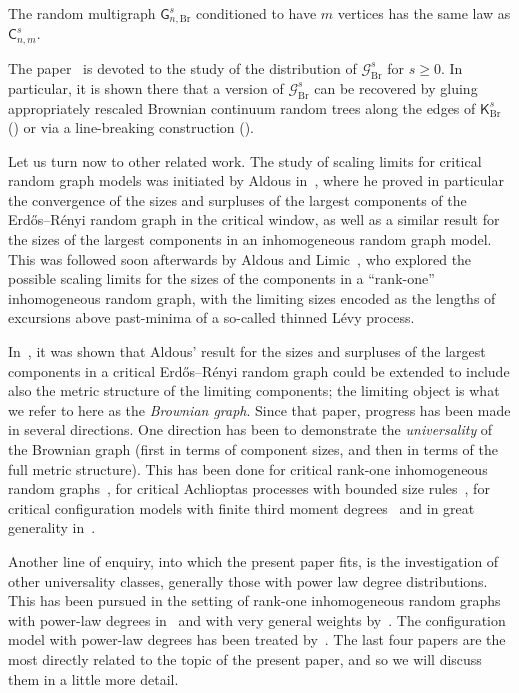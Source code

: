 \documentclass[AHL,Unicode,longabstracts,published]{cedram}
\newcommand{\Br}{\mathrm{Br}}
\newcommand{\cG}{\mathcal{G}}
\newcommand{\sG}{\mathsf{G}}
\newcommand{\sK}{\mathsf{K}}
\newcommand{\sC}{\mathsf{C}}
\begin{document}

\begin{coro}
The random multigraph $\sG_{n,\Br}^s$ conditioned to have $m$ vertices has the same law as $\sC_{n,m}^s$.
\end{coro}

The paper~\cite{ABBrGo} is devoted to the study of the distribution of $\cG_{\Br}^s$ for $s \ge 0$. In particular, it is shown there that a version of $\cG_{\Br}^s$ can be recovered by gluing appropriately rescaled Brownian continuum random trees along the edges of $\sK_{\Br}^s$ (\cite[Procedure~1]{ABBrGo}) or via a line-breaking construction (\cite[Procedure~2 $\&$ Theorem~4]{ABBrGo}).

Let us turn now to other related work. The study of scaling limits for critical random graph models was initiated by Aldous in~\cite{AldousCritRG}, where he proved in particular the convergence of the sizes and surpluses of the largest components of the Erd\H{o}s--Rényi random graph in the critical window, as well as a similar result for the sizes of the largest components in an inhomogeneous random graph model. This was followed soon afterwards by Aldous and Limic~\cite{AldousLimic}, who explored the possible scaling limits for the sizes of the components in a ``rank-one'' inhomogeneous random graph, with the limiting sizes encoded as the lengths of excursions above past-minima of a so-called thinned Lévy process.

In~\cite{ABBrGo12}, it was shown that Aldous' result for the sizes and surpluses of the largest components in a critical Erd\H{o}s--Rényi random graph could be extended to include also the metric structure of the limiting components; the limiting object is what we refer to here as the \emph{Brownian graph}. Since that paper, progress has been made in several directions. One direction has been to demonstrate the \emph{universality} of the Brownian graph (first in terms of component sizes, and then in terms of the full metric structure). This has been done for critical rank-one inhomogeneous random graphs~\cite{BhamidiSenWang17,BhvdHvL3rdMo,Turova}, for critical Achlioptas processes with bounded size rules~\cite{AugMultCoal}, for critical configuration models with finite third moment degrees~\cite{BS16+,DhvdHvLS17,Joseph14, NachmiasPeres,Riordan12} and in great generality in~\cite{BBSW14+}.

Another line of enquiry, into which the present paper fits, is the investigation of other universality classes, generally those with power law degree distributions. This has been pursued in the setting of rank-one inhomogeneous random graphs with power-law degrees in~\cite{BhvdHvLNovel,BhvdHSen18,vdH13} and with very general weights by~\cite{BrDuWa18,BrDuWa20}. The configuration model with power-law degrees has been treated by~\cite{BhDhvdHSen2020,BDvdHS17,DvdHvLS16,Joseph14}. The last four papers are the most directly related to the topic of the present paper, and so we will discuss them in a little more detail.
\end{document}
